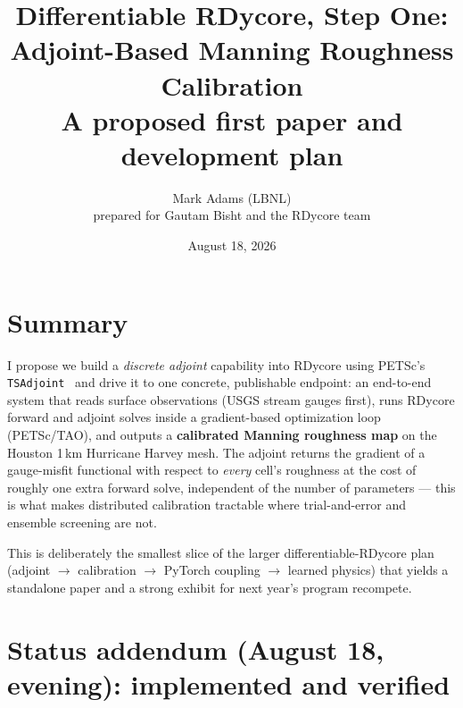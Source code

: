 \documentclass[11pt]{article}
\title{Differentiable RDycore, Step One:\\
Adjoint-Based Manning Roughness Calibration\\
\large A proposed first paper and development plan}
\author{Mark Adams (LBNL) \\ \small prepared for Gautam Bisht and the RDycore team}
\date{August 18, 2026}
\begin{document}
\maketitle

\section{Summary}

I propose we build a \emph{discrete adjoint} capability into RDycore using
PETSc's \texttt{TSAdjoint}~\cite{zhang2022tsadjoint} and drive it to one
concrete, publishable endpoint: an end-to-end system that reads surface
observations (USGS stream gauges first), runs RDycore forward and adjoint
solves inside a gradient-based optimization loop (PETSc/TAO), and outputs a
\textbf{calibrated Manning roughness map} on the Houston 1\,km Hurricane
Harvey mesh. The adjoint returns the gradient of a gauge-misfit functional
with respect to \emph{every} cell's roughness at the cost of roughly one
extra forward solve, independent of the number of parameters --- this is
what makes distributed calibration tractable where trial-and-error and
ensemble screening are not.

This is deliberately the smallest slice of the larger differentiable-RDycore
plan (adjoint $\rightarrow$ calibration $\rightarrow$ PyTorch coupling
$\rightarrow$ learned physics) that yields a standalone paper and a strong
exhibit for next year's program recompete.

\section*{Status addendum (August 18, evening): implemented and verified}

\end{document}
